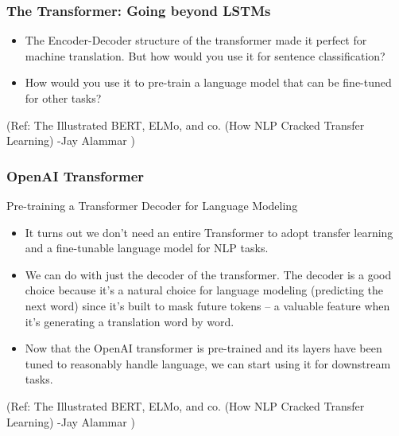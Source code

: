 \begin{frame}[fragile]\frametitle{The Transformer: Going beyond LSTMs}
\begin{itemize}
\item The Encoder-Decoder structure of the transformer made it perfect for machine translation. But how would you use it for sentence classification? 
\item How would you use it to pre-train a language model that can be fine-tuned for other tasks?
\end{itemize}


{\tiny (Ref: The Illustrated BERT, ELMo, and co. (How NLP Cracked Transfer Learning) -Jay Alammar )}
\end{frame}

\begin{frame}[fragile]\frametitle{OpenAI Transformer}
Pre-training a Transformer Decoder for Language Modeling 
\begin{itemize}
\item It turns out we don’t need an entire Transformer to adopt transfer learning and a fine-tunable language model for NLP tasks. 
\item We can do with just the decoder of the transformer. The decoder is a good choice because it’s a natural choice for language modeling (predicting the next word) since it’s built to mask future tokens – a valuable feature when it’s generating a translation word by word.
\item Now that the OpenAI transformer is pre-trained and its layers have been tuned to reasonably handle language, we can start using it for downstream tasks.
\end{itemize}


{\tiny (Ref: The Illustrated BERT, ELMo, and co. (How NLP Cracked Transfer Learning) -Jay Alammar )}
\end{frame}

